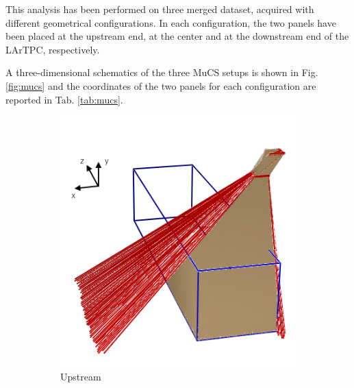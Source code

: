\documentclass[a4paper]{scrartcl}
\begin{document}
This analysis has been performed on three merged dataset, acquired with different geometrical configurations. In each configuration, the two panels have been placed at the upstream end, at the center and at the downstream end of the LArTPC, respectively.

A three-dimensional schematics of the three MuCS setups is shown in Fig. \ref{fig:mucs} and the coordinates of the two panels for each configuration are reported in Tab. \ref{tab:mucs}.
\begin{figure}[htbp]
  \begin{subfigure}{0.30\textwidth}
    \includegraphics[width=\linewidth]{figures/upstream.png}
    \caption{Upstream} \label{fig:upstream}
  \end{subfigure}
  \begin{subfigure}{0.30\textwidth}

\end{subfigure}
\end{figure}
\end{document}
